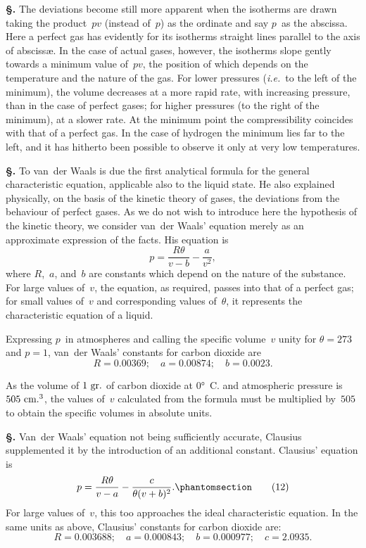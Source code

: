 \documentclass[12pt]{book}[2005/09/16]
\newcommand{\Chg}[2]{#2}
\newcommand{\Section}[1]{
  \medskip\par\textbf{§\;#1}
  \label{section:#1}
}
\newcommand{\Tag}[1]{%
  \phantomsection\label{eqn:#1}\tag*{\ensuremath{#1}}%
}
\newcommand{\PageSep}[1]{\ignorespaces}
\newcommand{\ie}{\emph{i.e.}}
\newcommand{\Unit}[1]{\text{\upshape #1}}
\begin{document}
\Section{23.} The deviations become still more apparent when
%
the isotherms are drawn taking the product~$pv$ (instead of~$p$)
as the ordinate and say $p$~as the abscissa. Here a perfect
gas has evidently for its isotherms straight lines parallel to
the axis of abscissæ. In the case of actual gases, however, the
isotherms slope gently towards a minimum value of~$pv$, the
position of which depends on the temperature and the nature
of the gas. For lower pressures (\ie\ to the left of the
minimum), the volume decreases at a more rapid rate, with
increasing pressure, than in the case of perfect gases; for
higher pressures (to the right of the minimum), at a slower
rate. At the minimum point the compressibility coincides
with that of a perfect gas. In the case of hydrogen the
minimum lies far to the left, and it has hitherto been
possible to observe it only at very low temperatures.

\Section{24.} To van~der Waals is due the first analytical formula
%
%
for the general characteristic equation, applicable also to
the liquid state. He also explained physically, on the basis
of the kinetic theory of gases, the deviations from the
behaviour of perfect gases. As we do not wish to introduce
here the hypothesis of the kinetic theory, we consider van~der
Waals' equation merely as an approximate expression of
the facts. His equation is
\[
p = \frac{R\theta}{v - b} - \frac{a}{v^{2}},
\]
where $R$,~$a$, and~$b$ are constants which depend on the nature
of the substance. For large values of~$v$, the equation, as
required, passes into that of a perfect gas; for small values
of~$v$ and corresponding values of~$\theta$, it represents the characteristic
equation of a liquid.

Expressing $p$~in atmospheres and calling the specific
\PageSep{14}
volume~$v$ unity for $\theta = 273$ and $p = 1$, van~der Waals'
constants for carbon dioxide are
%
\[
R = 0.00369;\quad
a = 0.00874;\quad
b = 0.0023.
\]

As the volume of $1~\Unit{gr.}$ of carbon dioxide at $0°$~C. and
atmospheric pressure is $505~\Chg{\Unit{c.c.}}{\Unit{cm.}^{3}}$, the values of~$v$ calculated
from the formula must be multiplied by~$505$ to
obtain the specific volumes in absolute units.

\Section{25.} Van~der Waals' equation not being sufficiently
%
%
accurate, Clausius supplemented it by the introduction of
an additional constant. Clausius' equation is
%
\[
p = \frac{R\theta}{v - a} - \frac{c}{\theta(v + b)^{2}}.
\Tag{(12)}
\]
For large values of~$v$, this too approaches the ideal
characteristic equation. In the same units as above, Clausius'
constants for carbon dioxide are:
\[
R = 0.003688;\quad
a = 0.000843;\quad
b = 0.000977;\quad
c = 2.0935.
\]
\end{document}
